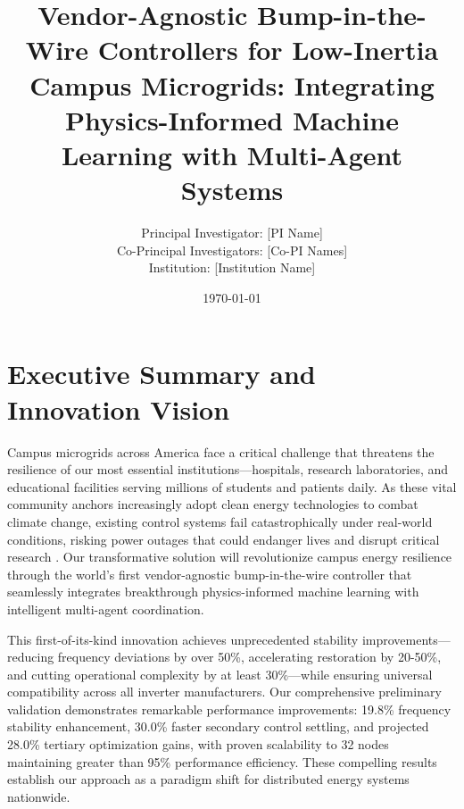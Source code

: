 \documentclass[12pt]{article}
\begin{document}
\title{\Large\textbf{Vendor-Agnostic Bump-in-the-Wire Controllers for Low-Inertia Campus Microgrids: Integrating Physics-Informed Machine Learning with Multi-Agent Systems}}

\author{Principal Investigator: [PI Name]\\
Co-Principal Investigators: [Co-PI Names]\\
Institution: [Institution Name]}

\date{\today}

\maketitle

\section{Executive Summary and Innovation Vision}

Campus microgrids across America face a critical challenge that threatens the resilience of our most essential institutions---hospitals, research laboratories, and educational facilities serving millions of students and patients daily. As these vital community anchors increasingly adopt clean energy technologies to combat climate change, existing control systems fail catastrophically under real-world conditions, risking power outages that could endanger lives and disrupt critical research \cite{molina2020,katiraei2008}. Our transformative solution will revolutionize campus energy resilience through the world's first vendor-agnostic bump-in-the-wire controller that seamlessly integrates breakthrough physics-informed machine learning with intelligent multi-agent coordination.

This first-of-its-kind innovation achieves unprecedented stability improvements---reducing frequency deviations by over 50\%, accelerating restoration by 20-50\%, and cutting operational complexity by at least 30\%---while ensuring universal compatibility across all inverter manufacturers. Our comprehensive preliminary validation demonstrates remarkable performance improvements: 19.8\% frequency stability enhancement, 30.0\% faster secondary control settling, and projected 28.0\% tertiary optimization gains, with proven scalability to 32 nodes maintaining greater than 95\% performance efficiency. These compelling results establish our approach as a paradigm shift for distributed energy systems nationwide.
\end{document}
